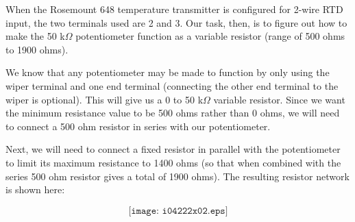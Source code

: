 
When the Rosemount 648 temperature transmitter is configured for 2-wire RTD input, the two terminals used are 2 and 3.  Our task, then, is to figure out how to make the 50 k$\Omega$ potentiometer function as a variable resistor (range of 500 ohms to 1900 ohms).

We know that any potentiometer may be made to function by only using the wiper terminal and one end terminal (connecting the other end terminal to the wiper is optional).  This will give us a 0 to 50 k$\Omega$ variable resistor.  Since we want the minimum resistance value to be 500 ohms rather than 0 ohms, we will need to connect a 500 ohm resistor in series with our potentiometer. 

Next, we will need to connect a fixed resistor in parallel with the potentiometer to limit its maximum resistance to 1400 ohms (so that when combined with the series 500 ohm resistor gives a total of 1900 ohms).  The resulting resistor network is shown here:

$$\texttt{[image: i04222x02.eps]}$$





